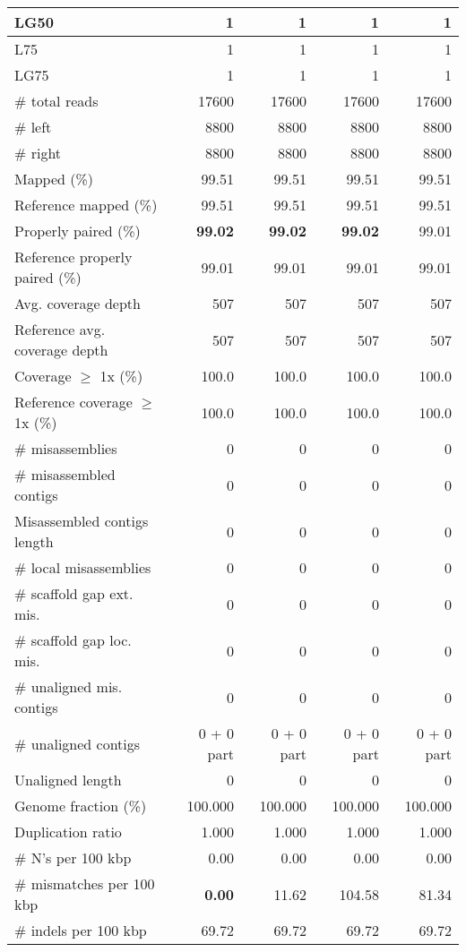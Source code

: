 \documentclass[12pt,a4paper]{article}
\begin{document}
\begin{table}[ht]
\begin{center}
\begin{tabular}{|l*{4}{|r}|}
LG50 & 1 & 1 & 1 & 1 \\ \hline
L75 & 1 & 1 & 1 & 1 \\ \hline
LG75 & 1 & 1 & 1 & 1 \\ \hline
\# total reads & 17600 & 17600 & 17600 & 17600 \\ \hline
\# left & 8800 & 8800 & 8800 & 8800 \\ \hline
\# right & 8800 & 8800 & 8800 & 8800 \\ \hline
Mapped (\%) & 99.51 & 99.51 & 99.51 & 99.51 \\ \hline
Reference mapped (\%) & 99.51 & 99.51 & 99.51 & 99.51 \\ \hline
Properly paired (\%) & {\bf 99.02} & {\bf 99.02} & {\bf 99.02} & 99.01 \\ \hline
Reference properly paired (\%) & 99.01 & 99.01 & 99.01 & 99.01 \\ \hline
Avg. coverage depth & 507 & 507 & 507 & 507 \\ \hline
Reference avg. coverage depth & 507 & 507 & 507 & 507 \\ \hline
Coverage $\geq$ 1x (\%) & 100.0 & 100.0 & 100.0 & 100.0 \\ \hline
Reference coverage $\geq$ 1x (\%) & 100.0 & 100.0 & 100.0 & 100.0 \\ \hline
\# misassemblies & 0 & 0 & 0 & 0 \\ \hline
\# misassembled contigs & 0 & 0 & 0 & 0 \\ \hline
Misassembled contigs length & 0 & 0 & 0 & 0 \\ \hline
\# local misassemblies & 0 & 0 & 0 & 0 \\ \hline
\# scaffold gap ext. mis. & 0 & 0 & 0 & 0 \\ \hline
\# scaffold gap loc. mis. & 0 & 0 & 0 & 0 \\ \hline
\# unaligned mis. contigs & 0 & 0 & 0 & 0 \\ \hline
\# unaligned contigs & 0 + 0 part & 0 + 0 part & 0 + 0 part & 0 + 0 part \\ \hline
Unaligned length & 0 & 0 & 0 & 0 \\ \hline
Genome fraction (\%) & 100.000 & 100.000 & 100.000 & 100.000 \\ \hline
Duplication ratio & 1.000 & 1.000 & 1.000 & 1.000 \\ \hline
\# N's per 100 kbp & 0.00 & 0.00 & 0.00 & 0.00 \\ \hline
\# mismatches per 100 kbp & {\bf 0.00} & 11.62 & 104.58 & 81.34 \\ \hline
\# indels per 100 kbp & 69.72 & 69.72 & 69.72 & 69.72 \\ \hline

\end{tabular}
\end{center}
\end{table}
\end{document}
